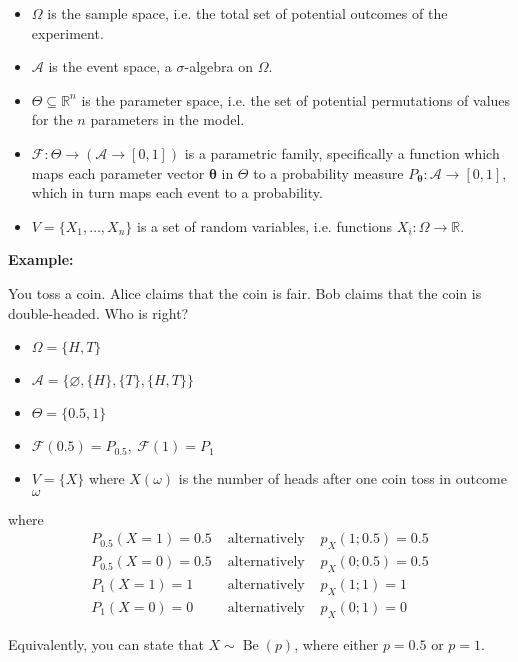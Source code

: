 \documentclass{article}
\begin{document}
\begin{itemize}
	\item \(\Omega\) is the sample space, i.e. the total set of potential outcomes of the experiment.
	\item \(\mathcal{A}\) is the event space, a \(\sigma\)-algebra on \(\Omega\).
	\item \(\Theta \subseteq \mathbb{R}^n\) is the parameter space, i.e. the set of potential permutations of values for the \(n\) parameters in the model.
	\item \(\mathcal{F} : \Theta \to (\mathcal{A}\to [0,1])\) is a parametric
family, specifically a function which maps each parameter vector
\(\boldsymbol{\theta}\) in \(\Theta\) to a probability measure
\(P_{\boldsymbol{\theta}}: \mathcal{A} \to [0,1]\), which in turn maps each event to a
probability.
	\item\(V=\{X_1, \ldots, X_n\}\) is a set of random variables, i.e.
functions \(X_i:\Omega \to \mathbb{R}\).
\end{itemize}

\textbf{Example:}

You toss a coin. Alice claims that the coin is fair. Bob claims that the coin
is double-headed. Who is right?

\begin{itemize}
	\item \(\Omega = \{H,T\}\)
	\item \(\mathcal{A} = \{\varnothing, \{H\}, \{T\}, \{H,T\}\}\)
	\item \(\Theta = \{0.5,1\}\)
	\item \(\mathcal{F}(0.5) = P_{0.5}, \ \mathcal{F}(1) = P_1\)
	\item\(V=\{X\}\) where \(X(\omega)\) is the number of heads after one coin toss in outcome \(\omega\)
\end{itemize}
where
\[
\begin{array}{lcr}
	P_{0.5}(X=1) = 0.5 & \text{ alternatively } & p_X(1;0.5) = 0.5 \\
	P_{0.5}(X=0) = 0.5 & \text{ alternatively } & p_X(0;0.5) = 0.5 \\
	P_1(X=1) = 1 & \text{ alternatively } & p_X(1;1) = 1 \\
	P_1(X=0) = 0 & \text{ alternatively } & p_X(0;1) = 0
\end{array}
\]

Equivalently, you can state that \(X \sim \operatorname{Be}(p)\), where either \(p=0.5\) or \(p=1\).
\end{document}
